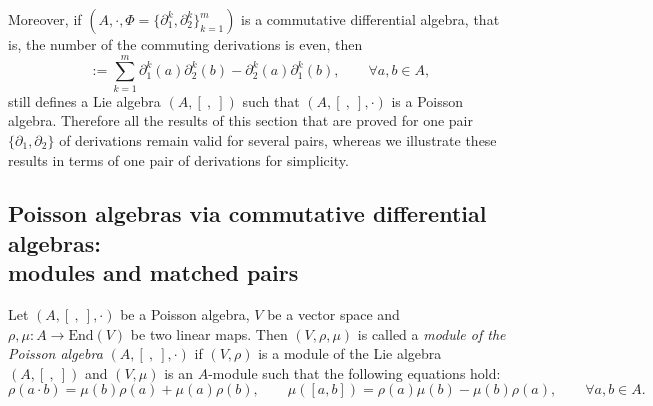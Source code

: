 \documentclass[10pt,a4paper]{amsart}
\numberwithin{equation}{section}
\newcommand{\End}{\mathrm{End}}
\begin{document}
Moreover, if $(A, \cdot, \Phi = \{\partial_1^k, \partial_2^k\}_{k=1}^m)$ is a commutative differential algebra,
that is, the number of the commuting derivations is even, then
\begin{equation*}
	[a, b] := \sum_{k=1}^m \partial^k_1(a) \partial^k_2(b) - \partial^k_2(a) \partial^k_1(b),\qquad \forall a, b \in A,
\end{equation*}
still defines a Lie algebra $(A,[\ ,\ ])$ such that $(A, [\ ,\ ], \cdot)$ is a Poisson algebra.
Therefore all the results of this section that are proved for one pair $\{\partial_1, \partial_2\}$ of derivations remain valid for several pairs,
whereas we illustrate these results in terms of one pair of derivations for simplicity.

\subsection[Poisson algebras via commutative differential algebras: modules and matched pairs]{Poisson algebras via commutative differential algebras:\\ modules and matched pairs}

\begin{Definition}
 Let $(A, [\ ,\ ], \cdot)$ be a Poisson algebra, $V$ be a vector space and $\rho, \mu\colon A \to \End (V)$ be two linear maps.
 Then $(V, \rho, \mu)$ is called a \textit{module of the Poisson algebra} $(A, [\ ,\ ], \cdot)$
 if $(V, \rho)$ is a module of the Lie algebra $(A, [\ ,\ ])$
 and $(V, \mu)$ is an $A$-module such that the following equations hold:
 \begin{equation*}
 \rho(a \cdot b) = \mu(b) \rho(a) + \mu(a) \rho(b), \qquad \mu([a,b])= \rho(a) \mu(b) - \mu(b) \rho(a), \qquad \forall a,b\in A.
 \end{equation*}
\end{Definition}
\end{document}
